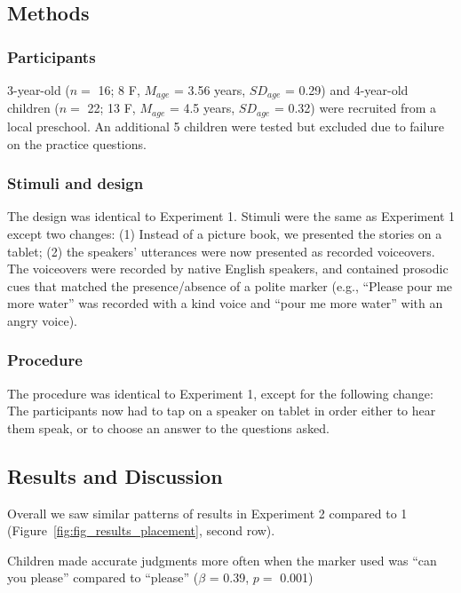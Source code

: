\documentclass[10pt, letterpaper]{article}
\begin{document}
\subsection{Methods}\label{methods-1}

\subsubsection{Participants}\label{participants-1}

3-year-old (\(n=\) 16; 8 F, \(M_{age}\) = 3.56 years, \(SD_{age}\) =
0.29) and 4-year-old children (\(n=\) 22; 13 F, \(M_{age}\) = 4.5 years,
\(SD_{age}\) = 0.32) were recruited from a local preschool. An
additional 5 children were tested but excluded due to failure on the
practice questions.

\subsubsection{Stimuli and design}\label{stimuli-and-design-1}

The design was identical to Experiment 1. Stimuli were the same as
Experiment 1 except two changes: (1) Instead of a picture book, we
presented the stories on a tablet; (2) the speakers' utterances were now
presented as recorded voiceovers. The voiceovers were recorded by native
English speakers, and contained prosodic cues that matched the
presence/absence of a polite marker (e.g., ``Please pour me more water''
was recorded with a kind voice and ``pour me more water'' with an angry
voice).

\subsubsection{Procedure}\label{procedure-1}

The procedure was identical to Experiment 1, except for the following
change: The participants now had to tap on a speaker on tablet in order
either to hear them speak, or to choose an answer to the questions
asked.

\subsection{Results and Discussion}\label{results-and-discussion-1}

Overall we saw similar patterns of results in Experiment 2 compared to 1
(Figure~\ref{fig:fig_results_placement}, second row).

Children made accurate judgments more often when the marker used was
``can you please'' compared to ``please'' (\(\beta\) = 0.39, \(p =\)
0.001)
\end{document}
